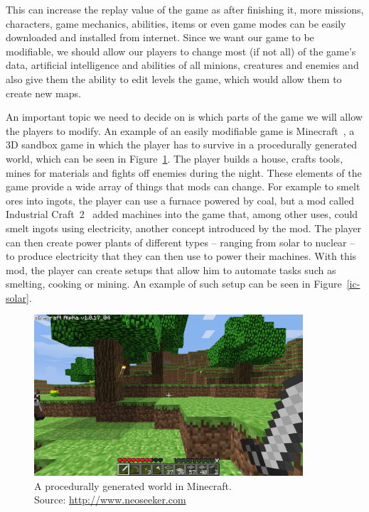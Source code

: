 This can increase the replay value of the game as after finishing it, more missions, characters, game mechanics, abilities, items
or even game modes can be easily downloaded and installed from internet. Since we want our game to be modifiable, we should allow our players
to change most (if not all) of the game's data, artificial intelligence and abilities of all minions, creatures and enemies and also give
them the ability to edit levels the game, which would allow them to create new maps.

An important topic we need to decide on is which parts of the game we will allow the players to modify. 
An example of an easily modifiable game is Minecraft~\cite{Minecraft}, a 3D sandbox game 
in which the player has to survive in a procedurally generated world, which can be seen in Figure~\ref{minecraft}. 
The player builds a house, crafts tools, mines for materials and
fights off enemies during the night. These elements of the game provide a wide array of things that mods can change. For example to smelt
ores into ingots, the player can use a furnace powered by coal, but a mod called Industrial Craft~2~\cite{IndustrialCraft} added machines
into the game that, among other uses, could smelt ingots using electricity, another concept introduced by the mod. The player can then
create power plants of different types -- ranging from solar to nuclear -- to produce electricity that they can then use to power their
machines. With this mod, the player can create setups that allow him to automate tasks such as smelting, cooking or mining. An example of
such setup can be seen in Figure~\ref{ic-solar}.

\begin{figure}[h]
    \centering
    \includegraphics[width=10cm]{../img/minecraft.jpg}
    \caption{A procedurally generated world in Minecraft.
             \\Source: \href{http://i.neoseeker.com/p/Games/PC/Simulation/City/minecraft\_image\_zx2AU2n6bZho0lz.jpg}{http://www.neoseeker.com}}
    \label{minecraft}
\end{figure}

